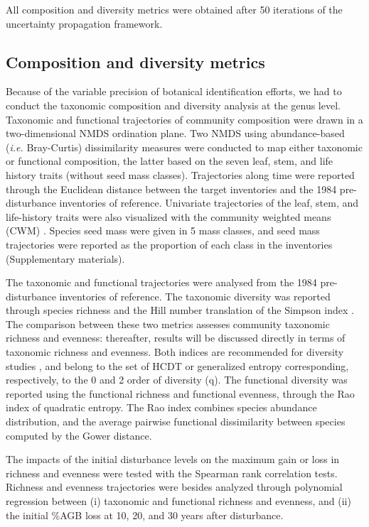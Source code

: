 \documentclass[fleqn,10pt]{ArtEcoFoG} %
\theoremstyle{definition}
\theoremstyle{definition}
\theoremstyle{definition}
\theoremstyle{remark}
\begin{document}
All composition and diversity metrics were obtained after 50 iterations
of the uncertainty propagation framework.

\subsection{Composition and diversity
metrics}\label{composition-and-diversity-metrics}

Because of the variable precision of botanical identification efforts,
we had to conduct the taxonomic composition and diversity analysis at
the genus level. Taxonomic and functional trajectories of community
composition were drawn in a two-dimensional NMDS ordination plane. Two
NMDS using abundance-based (\emph{i.e.} Bray-Curtis) dissimilarity
measures were conducted to map either taxonomic or functional
composition, the latter based on the seven leaf, stem, and life history
traits (without seed mass classes). Trajectories along time were
reported through the Euclidean distance between the target inventories
and the 1984 pre-disturbance inventories of reference. Univariate
trajectories of the leaf, stem, and life-history traits were also
visualized with the community weighted means (CWM) \citep{Diaz2007}.
Species seed mass were given in 5 mass classes, and seed mass
trajectories were reported as the proportion of each class in the
inventories (Supplementary materials).

The taxonomic and functional trajectories were analysed from the 1984
pre-disturbance inventories of reference. The taxonomic diversity was
reported through species richness and the Hill number translation of the
Simpson index \citep{Hill1973}. The comparison between these two metrics
assesses community taxonomic richness and evenness: thereafter, results
will be discussed directly in terms of taxonomic richness and evenness.
Both indices are recommended for diversity studies \citep{Marcon2015},
and belong to the set of HCDT or generalized entropy corresponding,
respectively, to the 0 and 2 order of diversity (q). The functional
diversity was reported using the functional richness and functional
evenness, through the Rao index of quadratic entropy. The Rao index
combines species abundance distribution, and the average pairwise
functional dissimilarity between species computed by the Gower distance.

The impacts of the initial disturbance levels on the maximum gain or
loss in richness and evenness were tested with the Spearman rank
correlation tests. Richness and evenness trajectories were besides
analyzed through polynomial regression between (i) taxonomic and
functional richness and evenness, and (ii) the initial \%AGB loss at 10,
20, and 30 years after disturbance.
\end{document}
